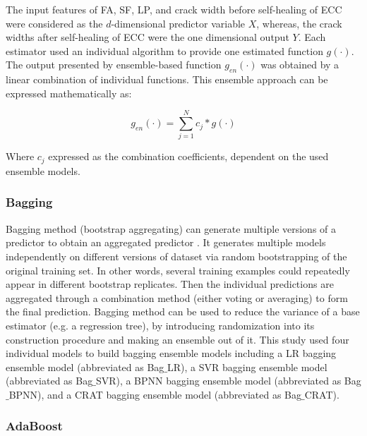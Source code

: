 \documentclass[11pt]{article}
\begin{document}
	The input features of FA, SF, LP, and crack width before self-healing of ECC were considered as the $d$-dimensional predictor variable $X$, whereas, the crack widths after self-healing of ECC were the one dimensional output $Y$.  Each estimator used an individual algorithm to provide one estimated function $g(\cdot)$. The output presented by ensemble-based function $g_{en}(\cdot)$ was obtained by a linear combination of individual functions. This ensemble approach can be expressed mathematically as:
	
	\begin{equation}
	g_{en}(\cdot) = \sum_{j=1}^{N}c_j *g(\cdot)
	\end{equation}
	
	Where $c_j$ expressed as the combination coefficients, dependent on the used ensemble models.  
	
	\subsubsection{Bagging}
	Bagging method (bootstrap aggregating) can generate multiple versions of a predictor to obtain an aggregated predictor \cite{breiman1996bagging}. It generates multiple models independently on different versions of dataset via random bootstrapping of the original training set. In other words, several training examples could repeatedly appear in different bootstrap replicates. Then the individual predictions are aggregated through a combination method (either voting or averaging) to form the final prediction. Bagging method can be used to reduce the variance of a base estimator (e.g. a regression tree), by introducing randomization into its construction procedure and making an ensemble out of it.
This study used four individual models to build bagging ensemble models including a LR bagging ensemble model (abbreviated as Bag$\_$LR), a SVR bagging ensemble model (abbreviated as Bag$\_$SVR), a BPNN bagging ensemble model (abbreviated as Bag$\_$BPNN), and a CRAT bagging ensemble model (abbreviated as Bag$\_$CRAT).


	
	\subsubsection{AdaBoost}
\end{document}
